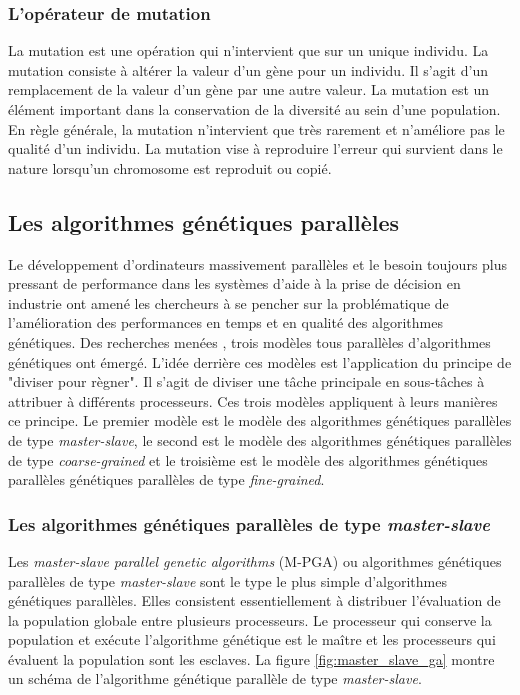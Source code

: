 	\subsubsection{L'opérateur de mutation}
	
	La mutation est une opération qui n'intervient que sur un unique individu. La mutation consiste à altérer la valeur d'un gène pour un individu. Il s'agit d'un remplacement de la valeur d'un gène par une autre valeur. La mutation est un élément important dans la conservation de la diversité au sein d'une population. En règle générale, la mutation n'intervient que très rarement et n'améliore pas le qualité d'un individu. La mutation vise à reproduire l'erreur qui survient dans le nature lorsqu'un chromosome est reproduit ou copié.
	
	\subsection{Les algorithmes génétiques parallèles}
	
	Le développement d'ordinateurs massivement parallèles et le besoin toujours plus pressant de performance dans les systèmes d'aide à la prise de décision en industrie ont amené les chercheurs à se pencher sur la problématique de l'amélioration des performances en temps et en qualité des algorithmes génétiques. Des recherches menées \cite{cant2}, trois modèles tous parallèles d'algorithmes génétiques ont émergé. L'idée derrière ces modèles est l'application du principe de "diviser pour règner". Il s'agit de diviser une tâche principale en sous-tâches à attribuer à différents processeurs. Ces trois modèles appliquent à leurs manières ce principe. Le premier modèle est le modèle des algorithmes génétiques parallèles de type \emph{master-slave}, le second est le modèle des algorithmes génétiques parallèles de type \emph{coarse-grained} et le troisième est le modèle des algorithmes génétiques parallèles génétiques parallèles de type \emph{fine-grained}.
	
	\subsubsection{Les algorithmes génétiques parallèles de type \emph{master-slave}}
	
	Les \emph{master-slave parallel genetic algorithms} (M-PGA) ou algorithmes génétiques parallèles de type \emph{master-slave} sont le type le plus simple d'algorithmes génétiques parallèles. Elles consistent essentiellement à distribuer l'évaluation de la population globale entre plusieurs processeurs. Le processeur qui conserve la population et exécute l'algorithme génétique est le maître et les processeurs qui évaluent la population sont les esclaves. La figure \ref{fig:master_slave_ga} montre un schéma de l'algorithme génétique parallèle de type \emph{master-slave}. 
	
